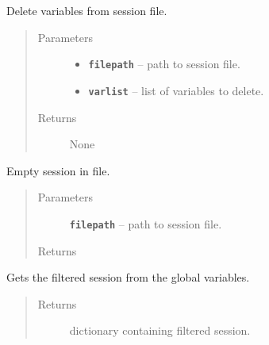 \documentclass[letterpaper,10pt,english]{sphinxmanual}
\begin{document}
\begin{fulllineitems}
\label{RRtoolbox.lib:RRtoolbox.lib.session.deleteFromSession}
Delete variables from session file.
\begin{quote}\begin{description}
\item[{Parameters}] \leavevmode\begin{itemize}
\item {} 
\textbf{\texttt{filepath}} -- path to session file.

\item {} 
\textbf{\texttt{varlist}} -- list of variables to delete.

\end{itemize}

\item[{Returns}] \leavevmode
None

\end{description}\end{quote}

\end{fulllineitems}


\begin{fulllineitems}
\label{RRtoolbox.lib:RRtoolbox.lib.session.flushSession}
Empty session in file.
\begin{quote}\begin{description}
\item[{Parameters}] \leavevmode
\textbf{\texttt{filepath}} -- path to session file.

\item[{Returns}] \leavevmode


\end{description}\end{quote}

\end{fulllineitems}


\begin{fulllineitems}
\label{RRtoolbox.lib:RRtoolbox.lib.session.getEnviromentSession}
Gets the filtered session from the global variables.
\begin{quote}\begin{description}
\item[{Returns}] \leavevmode
dictionary containing filtered session.

\end{description}\end{quote}

\end{fulllineitems}
\end{document}
